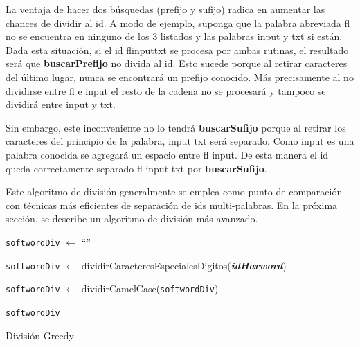 La ventaja de hacer dos búsquedas (prefijo y sufijo) radica en aumentar las chances de dividir al id. A modo de ejemplo, suponga que la palabra abreviada \textsf{fl}
no se encuentra en ninguno de los 3 listados y las palabras \textsf{input} y \textsf{txt} si están. Dada esta situación, si el id \textsf{flinputtxt} se procesa por ambas rutinas, el resultado será que \textbf{buscarPrefijo} no divida al id. Esto sucede porque al retirar caracteres del último lugar, nunca se encontrará un prefijo conocido. Más precisamente al no dividirse entre \textsf{fl} e \textsf{input} el resto de la cadena no se procesará y tampoco se dividirá entre \textsf{input} y \textsf{txt}. 

Sin embargo, este inconveniente no lo tendrá \textbf{buscarSufijo} porque al retirar los caracteres del principio de la palabra, \textsf{input txt} será separado. Como \textsf{input} es una palabra conocida se agregará un espacio entre \textsf{fl input}. De esta manera el id queda correctamente separado \textsf{fl input txt} por \textbf{buscarSufijo}.

Este algoritmo de división generalmente se emplea como punto de comparación con técnicas más eficientes de separación de ids multi-palabras. En la próxima sección, se describe un algoritmo de división más avanzado.

\begin{algorithm}[H]%
\LinesNumbered%

\BlankLine
\texttt{softwordDiv} $\leftarrow$ “”

\texttt{softwordDiv} $\leftarrow$ dividirCaracteresEspecialesDigitos(\textit{\textbf{idHarword}})

\texttt{softwordDiv} $\leftarrow$ dividirCamelCase(\texttt{softwordDiv})

\BlankLine
{}
\BlankLine
\Return \texttt{softwordDiv} 

\caption{División Greedy\label{GSA}}
\end{algorithm}

